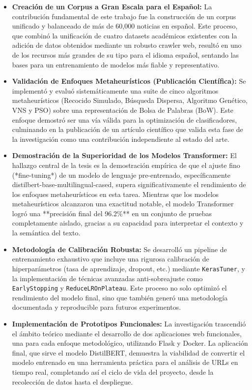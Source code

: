 \begin{itemize}
    \item \textbf{Creación de un Corpus a Gran Escala para el Español:} La contribución fundamental de este trabajo fue la construcción de un corpus unificado y balanceado de más de 60,000 noticias en español. Este proceso, que combinó la unificación de cuatro datasets académicos existentes con la adición de datos obtenidos mediante un robusto crawler web, resultó en uno de los recursos más grandes de su tipo para el idioma español, sentando las bases para un entrenamiento de modelos más fiable y representativo.

    \item \textbf{Validación de Enfoques Metaheurísticos (Publicación Científica):} Se implementó y evaluó sistemáticamente una suite de cinco algoritmos metaheurísticos (Recocido Simulado, Búsqueda Dispersa, Algoritmo Genético, VNS y PSO) sobre una representación de Bolsa de Palabras (BoW). Este enfoque demostró ser una vía válida para la optimización de clasificadores, culminando en la publicación de un artículo científico que valida esta fase de la investigación como una contribución independiente al estado del arte.

    \item \textbf{Demostración de la Superioridad de los Modelos Transformer:} El hallazgo central de la tesis es la demostración empírica de que el ajuste fino (*fine-tuning*) de un modelo de lenguaje pre-entrenado, específicamente distilbert-base-multilingual-cased, supera significativamente el rendimiento de los enfoques metaheurísticos en esta tarea. Mientras que los modelos metaheurísticos alcanzaron una exactitud notable, el modelo Transformer logró una **precisión final del 96.2\%** en un conjunto de pruebas completamente aislado, gracias a su capacidad para interpretar el contexto y la semántica del texto.

    \item \textbf{Metodología de Calibración Robusta:} Se desarrolló un pipeline de entrenamiento exhaustivo que incluye una rigurosa calibración de hiperparámetros (tasa de aprendizaje, dropout, etc.) mediante \texttt{KerasTuner}, y la implementación de técnicas avanzadas anti-sobreajuste como \texttt{EarlyStopping} y \texttt{ReduceLROnPlateau}. Este proceso no solo optimizó el rendimiento del modelo final, sino que también generó una metodología documentada y reproducible para futuros experimentos.

    \item \textbf{Implementación de Prototipos Funcionales:} La investigación trascendió el ámbito teórico mediante el desarrollo de dos aplicaciones web funcionales, una para cada enfoque metodológico, utilizando Flask y Docker. La aplicación final, que sirve el modelo DistilBERT, demuestra la viabilidad de convertir el modelo entrenado en una herramienta práctica para el análisis de URLs en tiempo real, completando así el ciclo de vida del proyecto, desde la recolección de datos hasta el despliegue.
\end{itemize}

